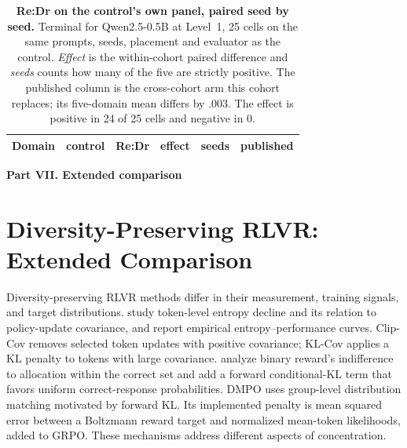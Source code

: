 \begin{table}[!htbp]
  \centering
  \caption{\textbf{Re:Dr on the control's own panel, paired seed by seed.}
  Terminal \pmd{} for Qwen2.5-0.5B at Level~1, 25 cells on the same
  prompts, seeds, placement and evaluator as the control. \emph{Effect} is the
  within-cohort paired difference and \emph{seeds} counts how many of the five
  are strictly positive. The published column is the cross-cohort arm this
  cohort replaces; its five-domain mean differs by .003. The effect is
  positive in 24 of 25 cells and negative in
  0.}
  \label{tab:matched-redr}
  \small
  \setlength{\tabcolsep}{6pt}
  \begin{tabular}{@{}l*{5}{r}@{}}
    \toprule
    \textbf{Domain} & \textbf{control} & \textbf{Re:Dr} & \textbf{effect}
      & \textbf{seeds} & \textbf{published} \\
    \midrule
    
  \end{tabular}
\end{table}

\clearpage
{}
\begin{center}\large\textbf{Part VII. Extended comparison}\end{center}

\section{Diversity-Preserving RLVR: Extended Comparison}
\label{app:related-extended}

Diversity-preserving RLVR methods differ in their measurement, training
signals, and target distributions. \citet{cui2025entropy} study token-level
entropy decline and its relation to policy-update covariance, and report
empirical entropy--performance curves. Clip-Cov removes selected token
updates with positive covariance; KL-Cov applies a KL penalty to tokens with
large covariance. \citet{lochab2026ucpo} analyze binary reward's indifference
to allocation within the correct set and add a forward conditional-KL term
that favors uniform correct-response probabilities. DMPO
\citep{li2026distribution} uses group-level distribution matching motivated
by forward KL. Its implemented penalty is mean squared error between a
Boltzmann reward target and normalized mean-token likelihoods, added to
GRPO. These mechanisms address different aspects of concentration.

